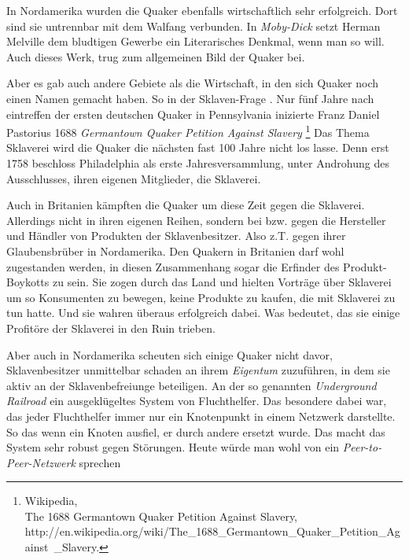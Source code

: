 \medskip

In Nordamerika wurden die Quaker ebenfalls wirtschaftlich sehr erfolgreich. Dort
sind sie untrennbar mit dem Walfang  verbunden. In \textit{Moby-Dick} setzt
Herman Melville  dem bludtigen Gewerbe ein Literarisches Denkmal, wenn man so
will. Auch dieses Werk, trug zum allgemeinen Bild der Quaker bei.

\medskip

Aber es gab auch andere Gebiete als die Wirtschaft, in den sich Quaker noch
einen
Namen gemacht haben. So in der Sklaven-Frage . Nur fünf Jahre nach eintreffen
der ersten deutschen Quaker in Pennsylvania inizierte Franz Daniel Pastorius 
1688 \textit{Germantown Quaker Petition Against Slavery} 
\footnote{Wikipedia,
\\The 1688 Germantown Quaker Petition Against Slavery,
\\http://en.wikipedia.org/wiki/The\_1688\_Germantown\_Quaker\_Petition\_Against\
\_Slavery.} Das Thema Sklaverei wird die Quaker die nächsten fast 100 Jahre
nicht
los lasse. Denn erst 1758 beschloss Philadelphia  als erste Jahresversammlung,
unter Androhung des Ausschlusses, ihren eigenen Mitglieder, die Sklaverei.

\medskip

Auch in Britanien kämpften die Quaker um diese Zeit gegen die Sklaverei.
Allerdings nicht in ihren eigenen Reihen, sondern bei bzw. gegen die Hersteller
und Händler von Produkten der Sklavenbesitzer. Also z.T. gegen ihrer
Glaubensbrüber in Nordamerika. Den Quakern in Britanien darf wohl zugestanden
werden, in diesen Zusammenhang sogar die Erfinder des Produkt-Boykotts  zu sein.
Sie zogen durch das Land und hielten Vorträge über Sklaverei um so Konsumenten
zu
bewegen, keine Produkte zu kaufen, die mit Sklaverei zu tun hatte. Und sie
wahren überaus erfolgreich dabei. Was bedeutet, das sie einige Profitöre der
Sklaverei in den Ruin trieben.

\medskip

Aber auch in Nordamerika  scheuten sich einige Quaker nicht davor,
Sklavenbesitzer unmittelbar schaden an ihrem \textit{Eigentum} zuzuführen, in
dem sie aktiv an der Sklavenbefreiunge beteiligen. An der so genannten
\textit{Underground Railroad} \index{Underground Railroad} ein ausgeklügeltes System von Fluchthelfer. Das
besondere dabei war, das jeder Fluchthelfer \index{Personen:!Fluchthelfer} immer nur ein Knotenpunkt in einem
Netzwerk darstellte. So das wenn ein Knoten ausfiel, er durch andere ersetzt
wurde. Das macht das System sehr robust gegen Störungen. Heute würde man wohl
von ein \textit{Peer-to-Peer-Netzwerk} sprechen

